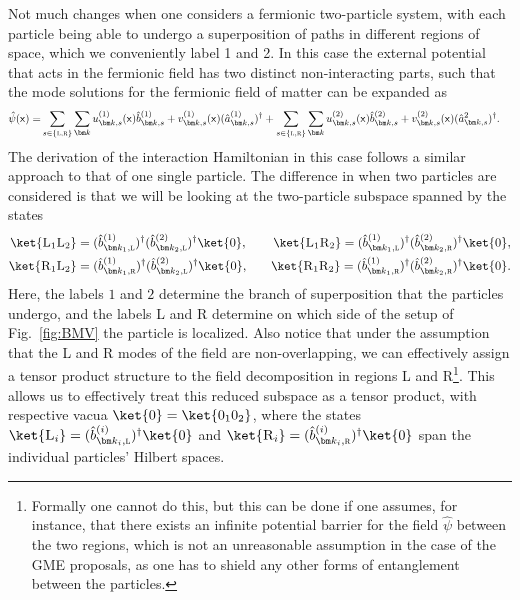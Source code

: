 \documentclass[letterpaper,12pt,titlepage,oneside,final]{book}
\newcommand{\mf}{\mathsf}%
\newcommand{\tc}[1]{\textsc{#1}}
\begin{document}
Not much changes when one considers a fermionic two-particle system, with each particle being able to undergo a superposition of paths in different regions of space, which we conveniently label 1 and 2. In this case the external potential that acts in the fermionic field has two distinct non-interacting parts, such that the mode solutions for the fermionic field of matter can be expanded as
\begin{align}
    \hat{\psi}(\mf x) = &\sum_{s\in\{\tc{l,r}\}} \sum_{\bm k} u^{(1)}_{\bm k,s}(\mf x) \hat{b}^{(1)}_{\bm k,s} + v^{(1)}_{\bm k,s}(\mf x) (\hat{a}^{(1)}_{\bm k,s})^\dagger+ \sum_{s\in\{\tc{l},\tc{r}\}} \sum_{\bm k} u^{(2)}_{\bm k,s}(\mf x) \hat{b}^{(2)}_{\bm k,s} + v^{(2)}_{\bm k,s}(\mf x) (\hat{a}^{2}_{\bm k,s})^\dagger.
\end{align}
The derivation of the interaction Hamiltonian in this case follows a similar approach to that of one single particle. The difference in when two particles are considered is that we will be looking at the two-particle subspace spanned by the states
\begin{align}
    \ket{\tc{L}_1\tc{L}_2} &= (\hat{b}^{(1)}_{\bm k_1,\tc{l}})^\dagger(\hat{b}^{(2)}_{\bm k_2,\tc{l}})^\dagger \ket{0}, &&&
    \ket{\tc{L}_1\tc{R}_2} = (\hat{b}^{(1)}_{\bm k_1,\tc{l}})^\dagger(\hat{b}^{(2)}_{\bm k_2,\tc{r}})^\dagger \ket{0}, \\
    \ket{\tc{R}_1\tc{L}_2} &= (\hat{b}^{(1)}_{\bm k_1,\tc{r}})^\dagger(\hat{b}^{(2)}_{\bm k_2,\tc{l}})^\dagger \ket{0}, &&&
    \ket{\tc{R}_1\tc{R}_2} = (\hat{b}^{(1)}_{\bm k_1,\tc{r}})^\dagger(\hat{b}^{(2)}_{\bm k_2,\tc{r}})^\dagger \ket{0}. 
\end{align}
Here, the labels $1$ and $2$ determine the branch of superposition that the particles undergo, and the labels L and R determine on which side of the setup of Fig.~\ref{fig:BMV} the particle is localized. Also notice that under the assumption that the L and R modes of the field are non-overlapping, we can effectively assign a tensor product structure to the field decomposition in regions L and R\footnote{Formally one cannot do this, but this can be done if one assumes, for instance, that there exists an infinite potential barrier for the field $\hat{\psi}$ between the two regions, which is not an unreasonable assumption in the case of the GME proposals, as one has to shield any other forms of entanglement between the particles.}. This allows us to effectively treat this reduced subspace as a tensor product, with respective vacua $\ket{0} = \ket{0_10_2}$, where the states $\ket{\tc{L}_i} = (\hat{b}^{(i)}_{\bm k_i,\tc{l}})^\dagger \ket{0}$ and $\ket{\tc{R}_i} = (\hat{b}^{(i)}_{\bm k_i,\tc{r}})^\dagger \ket{0}$ span the individual particles' Hilbert spaces.
\end{document}
